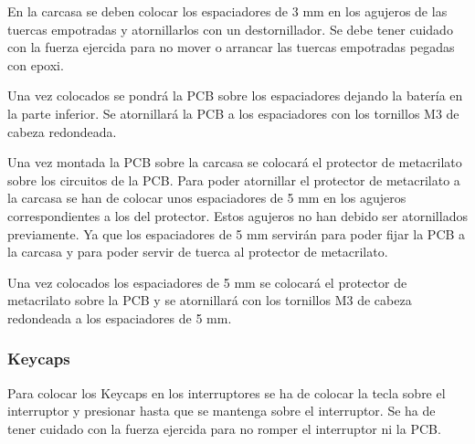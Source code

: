 En la carcasa se deben colocar los espaciadores de 3 mm en los agujeros de las tuercas empotradas y atornillarlos con un destornillador. Se debe tener cuidado con la fuerza ejercida para no mover o arrancar las tuercas empotradas pegadas con epoxi.

Una vez colocados se pondrá la \gls{PCB} sobre los espaciadores dejando la batería en la parte inferior. Se atornillará la \gls{PCB} a los espaciadores con los tornillos M3 de cabeza redondeada.

Una vez montada la \gls{PCB} sobre la carcasa se colocará el protector de metacrilato sobre los circuitos de la \gls{PCB}. Para poder atornillar el protector de metacrilato a la carcasa se han de colocar unos espaciadores de 5 mm en los agujeros correspondientes a los del protector. Estos agujeros no han debido ser atornillados previamente. Ya que los espaciadores de 5 mm servirán para poder fijar la \gls{PCB} a la carcasa y para poder servir de tuerca al protector de metacrilato.

Una vez colocados los espaciadores de 5 mm se colocará el protector de metacrilato sobre la \gls{PCB} y se atornillará con los tornillos M3 de cabeza redondeada a los espaciadores de 5 mm.

\subsubsection{\gls{Keycaps}}
Para colocar los \gls{Keycaps} en los interruptores se ha de colocar la tecla sobre el interruptor y presionar hasta que se mantenga sobre el interruptor. Se ha de tener cuidado con la fuerza ejercida para no romper el interruptor ni la \gls{PCB}.